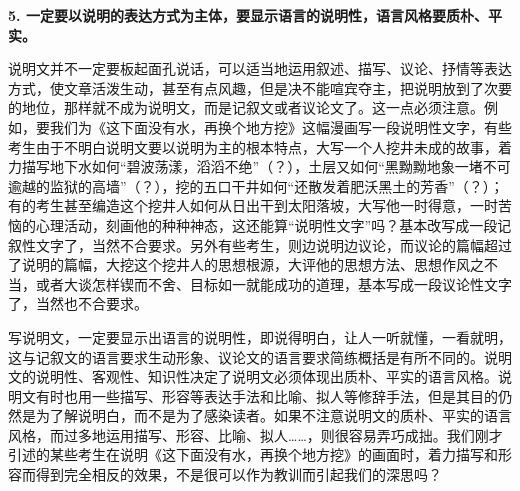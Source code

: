 \textbf{5. 一定要以说明的表达方式为主体，要显示语言的说明性，语言风格要质朴、平实。}

说明文并不一定要板起面孔说话，可以适当地运用叙述、描写、议论、抒情等表达方式，使文章活泼生动，甚至有点风趣，但是决不能喧宾夺主，把说明放到了次要的地位，那样就不成为说明文，而是记叙文或者议论文了。这一点必须注意。例如，要我们为《这下面没有水，再换个地方挖》这幅漫画写一段说明性文字，有些考生由于不明白说明文要以说明为主的根本特点，大写一个人挖井未成的故事，着力描写地下水如何“碧波荡漾，滔滔不绝”（？），土层又如何“黑黝黝地象一堵不可逾越的监狱的高墙”（？），挖的五口干井如何“还散发着肥沃黑土的芳香”（？）；有的考生甚至编造这个挖井人如何从日出干到太阳落坡，大写他一时得意，一时苦恼的心理活动，刻画他的种种神态，这还能算“说明性文字”吗？基本改写成一段记叙性文字了，当然不合要求。另外有些考生，则边说明边议论，而议论的篇幅超过了说明的篇幅，大挖这个挖井人的思想根源，大评他的思想方法、思想作风之不当，或者大谈怎样锲而不舍、目标如一就能成功的道理，基本写成一段议论性文字了，当然也不合要求。

写说明文，一定要显示出语言的说明性，即说得明白，让人一听就懂，一看就明，这与记叙文的语言要求生动形象、议论文的语言要求简练概括是有所不同的。说明文的说明性、客观性、知识性决定了说明文必须体现出质朴、平实的语言风格。说明文有时也用一些描写、形容等表达手法和比喻、拟人等修辞手法，但是其目的仍然是为了解说明白，而不是为了感染读者。如果不注意说明文的质朴、平实的语言风格，而过多地运用描写、形容、比喻、拟人……，则很容易弄巧成拙。我们刚才引述的某些考生在说明《这下面没有水，再换个地方挖》的画面时，着力描写和形容而得到完全相反的效果，不是很可以作为教训而引起我们的深思吗？
\newpage